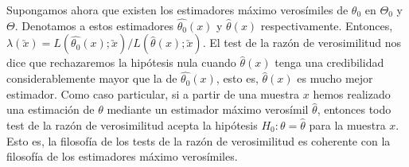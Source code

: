         Supongamos ahora que existen los estimadores máximo verosímiles de $\theta_0$ en $\Theta_0$ y $\Theta$. Denotamos a estos estimadores $\hat{\theta_0}(x)$ y $\hat{\theta}(x)$ respectivamente. Entonces, $\lambda(\utilde{x}) = L(\hat{\theta_0}(x);\utilde{x}) / L(\hat{\theta}(x);\utilde{x})$. El test de la razón de verosimilitud nos dice que rechazaremos la hipótesis nula cuando $\hat{\theta}(x)$  tenga una credibilidad considerablemente mayor que la de $\hat{\theta_0}(x)$, esto es, $\hat{\theta}(x)$ es mucho mejor estimador. Como caso particular, si a partir de una muestra $x$ hemos realizado una estimación de $\theta$ mediante un estimador máximo verosímil $\hat{\theta}$, entonces todo test de la razón de verosimilitud acepta la hipótesis $H_0: \theta = \hat{\theta}$ para la muestra $x$. Esto es, la filosofía de los tests de la razón de verosimilitud es coherente con la filosofía de los estimadores máximo verosímiles.

